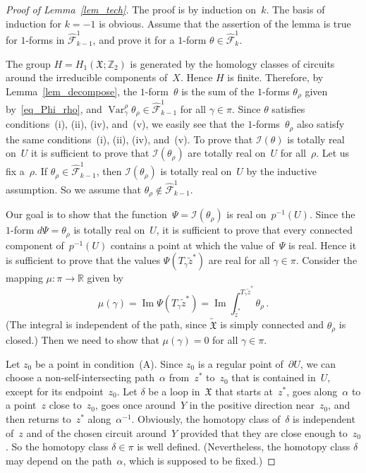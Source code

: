 \documentclass[reqno,tbtags,12pt]{amsart}
\numberwithin{equation}{section}
\newcommand{\R}{\mathbb{R}}
\newcommand{\Z}{\mathbb{Z}}
\newcommand{\FX}{\mathfrak{X}}
\newcommand{\tFX}{\widetilde{\mathfrak{X}}}
\newcommand{\hCF}{\widehat{\mathcal{F}}}
\newcommand{\I}{\mathcal{I}}
\newcommand{\tz}{\tilde{z}}
\renewcommand{\Im}{\mathop{\mathrm{Im}}\nolimits}
\newcommand{\Var}{\mathop{\mathrm{Var}}\nolimits}
\theoremstyle{definition}
\begin{document}
\begin{proof}[Proof of Lemma~\ref{lem_tech}]
The proof is by induction on~$k$. The basis of induction for $k=-1$ is obvious. Assume that the assertion of the lemma is true for  $1$-forms in $\hCF^1_{k-1}$, and prove it for a $1$-form $\theta\in\hCF^1_k$. 

The group $H=H_1(\FX;\Z_2)$ is generated by the homology classes of circuits around the irreducible components of~$X$. Hence $H$ is finite. Therefore,
by Lemma~\ref{lem_decompose}, the $1$-form~$\theta$ is the sum of the $1$-forms $\theta_{\rho}$ given by~\eqref{eq_Phi_rho}, and $\Var_{\gamma}^{\rho}\theta_{\rho}\in\hCF^1_{k-1}$ for all $\gamma\in\pi$. Since $\theta$ satisfies conditions~(i), (ii), (iv), and~(v), we easily see that  the $1$-forms~$\theta_{\rho}$ also satisfy the same conditions~(i), (ii), (iv), and~(v). To prove that $\I(\theta)$ is totally real on~$U$ it is sufficient to prove that $\I(\theta_{\rho})$ are totally real on~$U$ for all~$\rho$. Let us fix a~$\rho$. If $\theta_{\rho}\in\hCF^1_{k-1}$, then $\I(\theta_{\rho})$ is totally real on~$U$ by the inductive assumption. So we assume that $\theta_{\rho}\notin\hCF^1_{k-1}$.


 Our goal is to show that the function~$\Psi=\I(\theta_{\rho})$ is real on~$p^{-1}(U)$. Since the $1$-form $d\Psi=\theta_{\rho}$ is totally real on~$U$, it is sufficient to prove that every connected component of~$p^{-1}(U)$ contains a point at which the value of~$\Psi$ is real. Hence it is sufficient to prove that the values $\Psi(T_{\gamma}\tz^*)$ are real for all $\gamma\in\pi$. Consider the mapping $\mu\colon\pi\to\R$ given by
\begin{equation*}
\mu(\gamma)=
\Im\Psi(T_{\gamma}\tz^*)=\Im\int_{\tz^*}^{T_{\gamma}\tz^*}\theta_{\rho}\,.
\end{equation*}
(The integral is independent of the path, since $\tFX$ is simply connected and $\theta_{\rho}$ is closed.)
Then we need to show that $\mu(\gamma)=0$ for all $\gamma\in\pi$. 

Let $z_0$ be a point in condition~(A). Since $z_0$ is a regular point of~$\partial U$, we can choose a non-self-intersecting path~$\alpha$ from~$z^*$ to~$z_0$ that is contained in~$U$, except for its endpoint~$z_0$. Let $\delta$ be a loop in~$\FX$ that starts at~$z^*$, goes along~$\alpha$ to a point~$z$ close to~$z_0$, goes once around~$Y$ in the positive direction near~$z_0$, and then returns to~$z^*$ along~$\alpha^{-1}$. Obviously, the homotopy class of~$\delta$ is independent of~$z$  and of the chosen circuit around~$Y$ provided that they are close enough to~$z_0$. So the homotopy class $\delta\in\pi$ is well defined. (Nevertheless, the homotopy class $\delta$ may depend on the path~$\alpha$, which is supposed to be fixed.) 




\end{proof}
\end{document}
